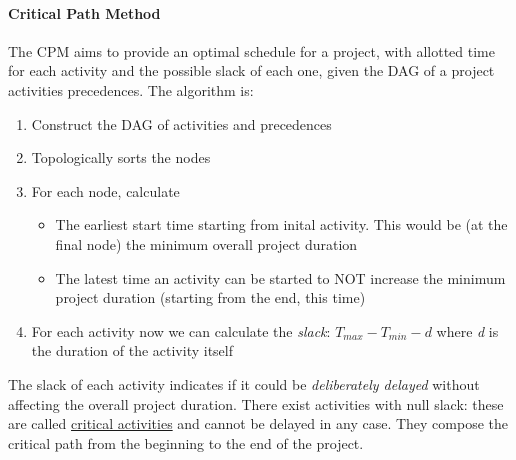             \paragraph{Critical Path Method}
                The CPM aims to provide an optimal schedule for a project, with allotted time for each activity and the possible slack of each one, given the DAG of a project activities precedences. The algorithm is:
                \begin{enumerate}
                    \item Construct the DAG of activities and precedences
                    \item Topologically sorts the nodes
                    \item For each node, calculate
                        \begin{itemize}
                            \item The earliest start time starting from inital activity. This would be (at the final node) the minimum overall project duration
                            \item The latest time an activity can be started to NOT increase the minimum project duration (starting from the end, this time)
                        \end{itemize}
                    \item For each activity now we can calculate the \textit{slack}: $T_{max} - T_{min} - d$ where \emph{d} is the duration of the activity itself
                \end{enumerate}
                The slack of each activity indicates if it could be \textit{deliberately delayed} without affecting the overall project duration. There exist activities with null slack: these are called \underline{critical activities} and cannot be delayed in any case. They compose the critical path from the beginning to the end of the project.
        
